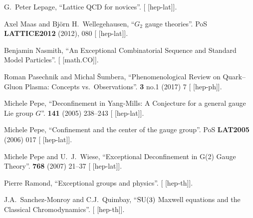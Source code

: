 \begin{thebibliography}{99}
G.~Peter Lepage,
``Lattice QCD for novices''.
[ [hep-lat]].


Axel Maas and Bj\"{o}rn H.~Wellegehausen,
``$G_2$ gauge theories''.
PoS \textbf{LATTICE2012} (2012), 080
{\tt{}}
[ [hep-lat]].

Benjamin Nasmith,
``An Exceptional Combinatorial Sequence and Standard Model Particles''.
[ [math.CO]].

Roman Pasechnik and Michal \v{S}umbera,
``Phenomenological Review on Quark--Gluon Plasma: Concepts vs.\ Observations''.
 \textbf{3} no.1 (2017) 7
{\tt{}}
[ [hep-ph]].

Michele Pepe,
``Deconfinement in Yang-Mills: A Conjecture for a general gauge Lie group $G$''.
 \textbf{141} (2005) 238--243
{\tt{}}
[ [hep-lat]].

Michele Pepe,
``Confinement and the center of the gauge group''.
PoS \textbf{LAT2005} (2006) 017
{\tt{}}
[ [hep-lat]].

Michele Pepe and U.~J.~Wiese,
``Exceptional Deconfinement in G(2) Gauge Theory''.
 \textbf{768} (2007) 21--37
{\tt{}}
[ [hep-lat]].

Pierre Ramond,
``Exceptional groups and physics''.
[ [hep-th]].


J.A.~Sanchez-Monroy and C.J.~Quimbay,
``$\operatorname{SU}(3)$ Maxwell equations and the Classical Chromodynamics''.
[ [hep-th]].



\end{thebibliography}
